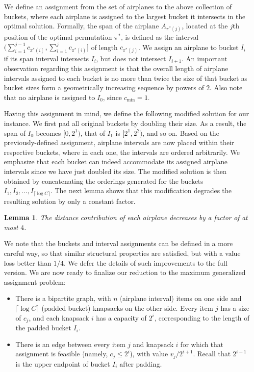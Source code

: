 \documentclass[11pt]{article}
\theoremstyle{plain}
\newtheorem{lemma}[theorem]{Lemma}
\theoremstyle{definition}
\begin{document}
We define an assignment from the set of airplanes to the above collection of buckets, where each airplane is assigned to the largest bucket it intersects in the optimal solution. Formally, the span of the airplane $A_{ \pi^*(j) }$, located at the $j$th position of the optimal permutation $\pi^*$, is defined as the interval $(\sum_{i=1}^{j-1} c_{\pi^*(i)}, \sum_{i=1}^{j} c_{\pi^*(i)}]$ of length $c_{\pi^*(j)}$. We assign an airplane to bucket $I_i$ if its span interval intersects $I_i$, but does not intersect $I_{i+1}$. An important observation regarding this assignment is that the overall length of airplane intervals assigned to each bucket is no more than twice the size of that bucket as bucket sizes form a geometrically increasing sequence by powers of $2$. Also note that no airplane is assigned to $I_0$, since $c_{\min} = 1$.

Having this assignment in mind, we define the following modified solution for our instance. We first pad all original buckets by doubling their size. As a result, the span of $I_0$ becomes $[0,2^1)$, that of $I_1$ is $[2^1,2^2)$, and so on. Based on the previously-defined assignment, airplane intervals are now placed within their respective buckets, where in each one, the intervals are ordered arbitrarily. We emphasize that each bucket can indeed accommodate its assigned airplane intervals since we have just doubled its size. The modified solution is then obtained by concatenating the orderings generated for the buckets $I_1, I_2, \ldots, I_{\lceil \log C \rceil}$. The next lemma shows that this modification degrades the resulting solution by only a constant factor.

\begin{lemma} \label{lemma:reduction}
The distance contribution of each airplane decreases by a factor of at most $4$.
\end{lemma}

We note that the buckets and interval assignments can be defined in a more careful way, so that similar structural properties are satisfied, but with a value loss better than $1/4$. We defer the details of such improvements to the full version. We are now ready to finalize our reduction to the maximum generalized assignment problem:
\begin{itemize}
\item There is a bipartite graph, with $n$ (airplane interval) items on one side and $\lceil \log C \rceil$ (padded bucket) knapsacks on the other side. Every item $j$ has a size of $c_j$, and each knapsack $i$ has a capacity of $2^i$, corresponding to the length of the padded bucket $I_i$.

\item There is an edge between every item $j$ and knapsack $i$ for which that assignment is feasible (namely, $c_j \leq 2^i$), with value $v_j / 2^{i+1}$. Recall that $2^{i+1}$ is the upper endpoint of bucket $I_i$ after padding.
\end{itemize}
\end{document}
